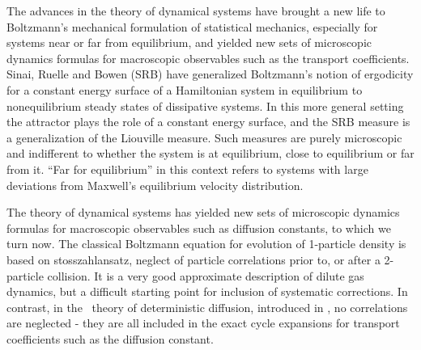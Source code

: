 


The advances in the theory of dynamical systems have brought a new
life to Boltzmann's mechanical formulation of statistical mechanics,
especially for systems near or far from equilibrium, and yielded new
sets of microscopic dynamics formulas for macroscopic observables such
as the transport coefficients. Sinai, Ruelle and Bowen (SRB) have
generalized Boltzmann's notion of ergodicity for a constant energy
surface of a Hamiltonian system in equilibrium to {nonequilibrium} steady states
of dissipative systems. In this
more general setting the attractor plays the role of a constant energy
surface, and the SRB measure is a generalization of the Liouville
measure. Such measures are purely microscopic and indifferent to
whether the system is at equilibrium, close to equilibrium or far from
it. ``Far for equilibrium'' in this context refers to systems with
large deviations from Maxwell's equilibrium velocity distribution.

The theory of dynamical systems has yielded new sets of
microscopic dynamics formulas for macroscopic observables such as
diffusion constants, to which we turn now.
The classical Boltzmann equation for evolution of 1-particle density
is based on stosszahlansatz, neglect of particle correlations prior
to, or after a 2-particle collision. It is a very good approximate
description of dilute gas dynamics, but a difficult starting point for
inclusion of systematic corrections. In contrast, in the \po\ theory of
deterministic diffusion, introduced in
, no correlations are neglected -
they are all included in the exact cycle expansions for transport
coefficients such as the diffusion constant.


